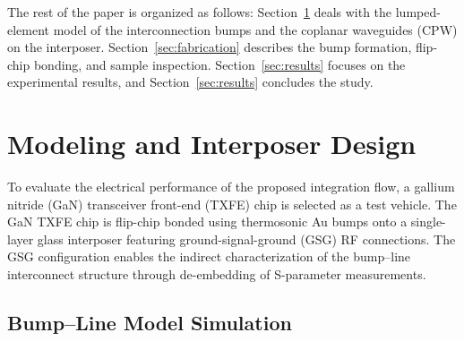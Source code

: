 \documentclass[conference,a4paper]{IEEEtran}
\begin{document}
The rest of the paper is organized as follows: Section~\ref{sec:model} deals with the lumped-element model of the interconnection bumps and the coplanar waveguides (CPW) on the interposer. Section~\ref{sec:fabrication} describes the bump formation, flip-chip bonding, and sample inspection. Section~\ref{sec:results} focuses on the experimental results, and Section~\ref{sec:results} concludes the study.

\section{Modeling and Interposer Design}\label{sec:model}
To evaluate the electrical performance of the proposed integration flow, a gallium nitride (GaN) transceiver front-end (TXFE) chip is selected as a test vehicle. The GaN TXFE chip is flip-chip bonded using thermosonic Au bumps onto a single-layer glass interposer featuring ground-signal-ground (GSG) RF connections. The GSG configuration enables the indirect characterization of the bump–line interconnect structure through de-embedding of S-parameter measurements.

\subsection{Bump--Line Model Simulation}\label{subsec:bump_line_model}
\end{document}
